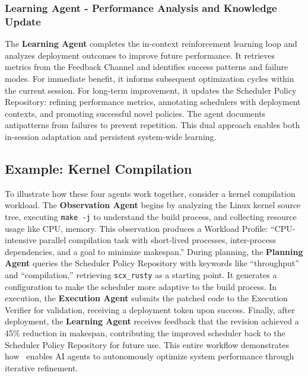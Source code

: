 \subsubsection{Learning Agent - Performance Analysis and Knowledge Update}

The \textbf{Learning Agent} completes the in-context reinforcement learning loop and analyzes deployment outcomes to improve future performance. It retrieves metrics from the Feedback Channel and identifies success patterns and failure modes. For immediate benefit, it informs subsequent optimization cycles within the current session. For long-term improvement, it updates the Scheduler Policy Repository: refining performance metrics, annotating schedulers with deployment contexts, and promoting successful novel policies. The agent documents antipatterns from failures to prevent repetition. This dual approach enables both in-session adaptation and persistent system-wide learning.


\subsection{Example: Kernel Compilation}

To illustrate how these four agents work together, consider a kernel compilation workload. The \textbf{Observation Agent} begins by analyzing the Linux kernel source tree, executing \texttt{make -j} to understand the build process, and collecting resource usage like CPU, memory. This observation produces a Workload Profile: ``CPU-intensive parallel compilation task with short-lived processes, inter-process dependencies, and a goal to minimize makespan.'' During planning, the \textbf{Planning Agent} queries the Scheduler Policy Repository with keywords like ``throughput'' and ``compilation,'' retrieving \texttt{scx\_rusty} as a starting point. It generates a configuration to make the scheduler more adaptive to the build process. In execution, the \textbf{Execution Agent} submits the patched code to the Execution Verifier for validation, receiving a deployment token upon success. Finally, after deployment, the \textbf{Learning Agent} receives feedback that the revision achieved a 45\% reduction in makespan, contributing the improved scheduler back to the Scheduler Policy Repository for future use. This entire workflow demonstrates how \agent\ enables AI agents to autonomously optimize system performance through iterative refinement.

